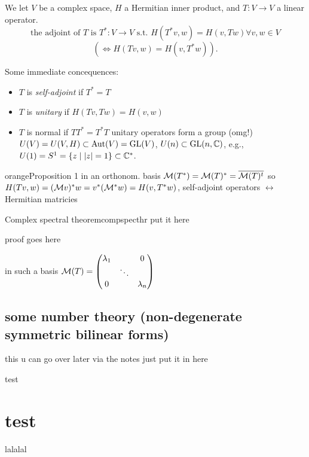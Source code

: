 \documentclass[12pt,oneside]{report}
\begin{document}
  \begin{definition}{}{}
 We let \( V \) be a complex space, \( H \) a Hermitian inner product, and \( T:V \to  V \) a linear operator.
  \begin{displaymath}
    \text{the adjoint of } T \text{ is } T^* : V \to  V \text{ s.t. } H(T^*v,w)=H(v,Tw) \forall v,w \in  V
  \end{displaymath}
  \[
    (\iff H(Tv,w)=H(v,T^*w))
  .\] 


\end{definition}{}{}
Some immediate concequences:
\begin{itemize}
  \item \( T \) is \textit{self-adjoint} if \( T^*=T \)
  \item \(  T \) is \textit{unitary} if \( H(Tv,Tw)=H(v,w) \)
  \item \( T \) is normal if \( TT^*=T^*T \)
    unitary operators form a group (omg!) \( U(V)=U(V,H) \subset \operatorname{Aut}(V) = \text{GL}(V) \), \( U(n) \subset  \text{GL}(n,\CC) \), e.g., \( U(1)=S^1=\{z \mid  |z| = 1\} \subset  \CC[*]  \). 
\end{itemize}





\begin{mybox}{orange}{Proposition 1}
    in an orthonom. basis \( \mathcal{M} (T^*) = \mathcal{M} (T)^*=\overline{\mathcal{M}(T)^t}  \) so \( H(Tv,w)=(\mathcal{M} v )^*w = v^* (\mathcal{M}^* w)=H(v,T^*w) \), self-adjoint operators \( \leftrightarrow \) Hermitian matricies 

\end{mybox}


\begin{definition}{Complex spectral theorem}{compspecthr}
  put it here 
\end{definition}

proof goes here

in such a basis \( \mathcal{M} (T) = \begin{pmatrix} \lambda_1 & \, & 0 \\ \, & \ddots& \, \\ 0 & \, & \lambda_n \end{pmatrix}  \)


\subsection{some number theory (non-degenerate symmetric bilinear forms)}

this u can go over later via the notes just put it in here





\begin{definition}{}{}
test
\end{definition}


\section{test}

lalalal


\end{document}
